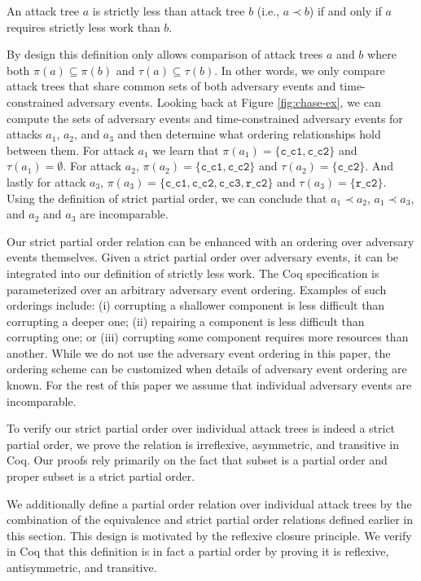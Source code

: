 \documentclass[runningheads]{llncs}
\theoremstyle{definition}
\begin{document}
\begin{definition}
  An attack tree $a$ is strictly less than attack tree $b$ (i.e., $a
  \prec b$) if and only if $a$ requires strictly less work than $b$. 
\end{definition}

\noindent By design this definition only allows comparison of
attack trees $a$ and $b$ where both $\pi(a) \subseteq \pi(b)$ and
$\tau(a) \subseteq \tau(b)$. In other words, we only compare attack
trees that share common sets of both adversary events and
time-constrained adversary events. Looking back at Figure
\ref{fig:chase-ex}, we can compute the sets of adversary events and
time-constrained adversary events for attacks $a_1$, $a_2$,
and $a_3$ and then determine what ordering relationships hold between
them. For attack $a_1$ we learn that $\pi(a_1) = \{ \texttt{c\_c1},
\texttt{c\_c2} \}$ and $\tau(a_1) = \emptyset$. For attack $a_2$,
$\pi(a_2) = \{ \texttt{c\_c1}, \texttt{c\_c2} \}$ and $\tau(a_2) = \{
\texttt{c\_c2} \}$. And lastly for attack $a_3$, $\pi(a_3) = \{
\texttt{c\_c1}, \texttt{c\_c2}, \texttt{c\_c3}, \texttt{r\_c2} \}$ and
$\tau(a_3) = \{ \texttt{r\_c2} \}$. Using the definition of strict
partial order, we can conclude that $a_1 \prec a_2$, $a_1 \prec
a_3$, and $a_2$ and $a_3$ are incomparable. 

Our strict partial order relation can be enhanced
with an ordering over adversary events themselves. Given a strict
partial order over adversary events, it can be integrated into our
definition of strictly less work. The Coq specification is
parameterized over an arbitrary adversary event ordering. Examples of
such orderings include: (i) corrupting a shallower
component is less difficult than corrupting a deeper one; (ii)
repairing a component is less difficult than corrupting one; or (iii)
corrupting some component requires more resources than another.  While we do not
use the adversary event ordering in this paper, the ordering scheme
can be customized when details of adversary event ordering are
known. For the rest of this paper we assume that individual adversary events 
are incomparable.

To verify our strict partial order over individual attack trees is
indeed a strict partial order, we prove the relation is irreflexive,
asymmetric, and transitive in Coq. Our proofs rely primarily on the
fact that subset is a partial order and proper subset is a strict
partial order.

We additionally define a partial order relation over individual attack
trees by the combination of the equivalence and strict partial order
relations defined earlier in this section. This design is motivated by
the reflexive closure principle. We verify in Coq that this definition
is in fact a partial order by proving it is reflexive, antisymmetric,
and transitive.
\end{document}
